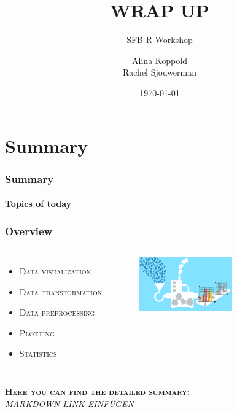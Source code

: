\documentclass{beamer}
\title{WRAP UP}
\subtitle{SFB R-Workshop}
\author{Alina Koppold \\ Rachel Sjouwerman}
\date{\tiny{\today}}
\institute{\url{a.koppold@uke.de}}
\begin{document}
\begin{frame}[plain,t]
\titlepage
\end{frame}

\section{Summary}
\begin{frame}
\frametitle{Summary}
\framesubtitle{Topics of today}
\frametitle{Overview}

\begin{columns} 
    \begin{itemize}
    \item \textsc{Data visualization}
    \item \textsc{Data transformation }
    \item \textsc{Data preprocessing}
    \item \textsc{Plotting }
    \item \textsc{Statistics}
    \end{itemize} 
     \begin{figure}
    \includegraphics[width =4cm]{data_processing.jpg}
    \vspace{3cm}
    \end{figure}
    \end{columns} 
\vspace{-2cm}
\textsc{\textbf{Here you can find the detailed summary:}}\\
\textit{MARKDOWN LINK EINFÜGEN}
\end{frame}



\end{document}
